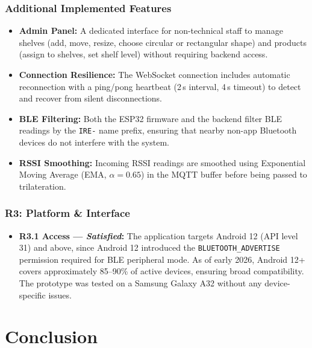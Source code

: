 \documentclass[12pt,a4paper]{article}
\begin{document}
\subsubsection*{Additional Implemented Features}
\begin{itemize}
    \item \textbf{Admin Panel:} A dedicated interface for non-technical staff
    to manage shelves (add, move, resize, choose circular or rectangular
    shape) and products (assign to shelves, set shelf level) without
    requiring backend access.

    \item \textbf{Connection Resilience:} The WebSocket connection includes
    automatic reconnection with a ping/pong heartbeat (2\,s interval,
    4\,s timeout) to detect and recover from silent disconnections.

    \item \textbf{BLE Filtering:} Both the ESP32 firmware and the backend
    filter BLE readings by the \texttt{IRE-} name prefix, ensuring that
    nearby non-app Bluetooth devices do not interfere with the system.

    \item \textbf{RSSI Smoothing:} Incoming RSSI readings are smoothed
    using Exponential Moving Average (EMA, $\alpha = 0.65$) in the MQTT
    buffer before being passed to trilateration.
\end{itemize}

\subsubsection*{R3: Platform \& Interface}

\begin{itemize}
    \item \textbf{R3.1 Access --- \textit{Satisfied}:}
    The application targets Android 12 (API level 31) and above, since Android 12 introduced the \texttt{BLUETOOTH\_ADVERTISE} permission required for BLE peripheral mode. As of early 2026, Android 12+ covers approximately 85--90\% of active devices, ensuring broad compatibility. The prototype was tested on a Samsung Galaxy A32 without any device-specific issues.
\end{itemize}

\section{Conclusion}
\end{document}
